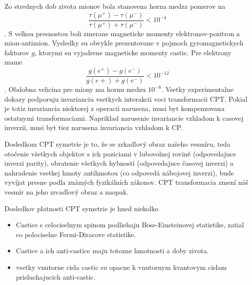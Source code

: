 \documentclass[../../main.tex]{subfiles}
\begin{document}
Zo strednych dob zivota mionov bola stanovena horna medza pomerov na $$ \frac{\tau(\mu^+)-\tau(\mu^-)}{\tau(\mu^+)+\tau(\mu^-)}<10^{-4} $$. 
S velkou presnostou boli zmerane magneticke momenty elektronov-pozitron a mion-antimion. Vysledky su obvykle prezentovane v pojmoch gyromagnetickych faktorov $g$, ktorymi su vyjadrene magneticke momenty castic. Pre elektrony mame $$ \frac{g(e^+)-g(e^-)}{g(e+)+g(e^-)}<10^{-12} $$.
Obdobna velicina pre miony ma hornu medzu $10^{-8}$. Vsetky experimentalne dokazy podporuju invarianciu vsetkych interakcii voci transformacii CPT. Pokial je totiz invariancia niektorej z operacii narusena, musi byt kompenzovana ostatnymi transformaciami. Napriklad narusenie invariancie vzhladom k casovej inverzii, musi byt tiez narusena invariancia vzhladom k CP.\par
Dosledkom CPT symetrie je to, že se zrkadlový obraz našeho vesmíru, teda otočenie všetkych objektov s ich poziciami v lubovolnej rovině (odpovedajuce inverzi parity), obratenie všetkych hybností (odpovedajuce časovej inverzi) a nahradenie vsetkej hmoty antihmotou (co odpovedá nábojovej inverzi), bude vyvíjat presne podla známých fyzikálních zákonov. CPT transformacia zmení náš vesmír na jeho zrcadlový obraz a naopak. \par
Dosledkov platnosti CPT symetrie je hned niekolko
\begin{itemize}
	\item Castice s celociselnym spinom podliehaju Bose-Einsteinovej statistike, zatial co polociselne Fermi-Diracove statistike.
	\item Castice a ich anti-castice maju totozne hmotnosti a doby zivota.
	\item vsetky vnutorne cisla castic su opacne k vnutornym kvantovym cislam prisluchajucich anti-castic.
\end{itemize}
\end{document}
